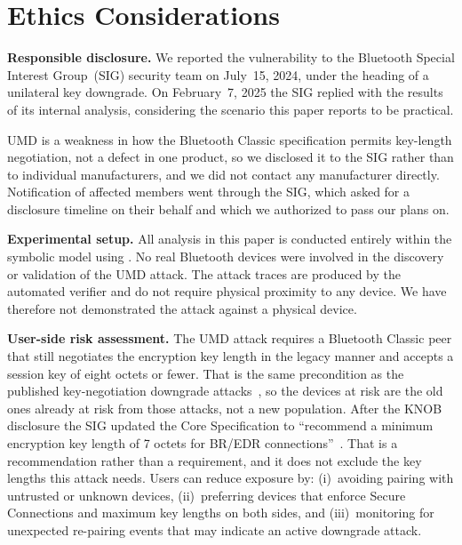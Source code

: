 \section*{Ethics Considerations}

\noindent
\textbf{Responsible disclosure.}
We reported the vulnerability to the Bluetooth Special Interest Group~(SIG) security team on July~15, 2024, 
under the heading of a unilateral key downgrade.
On February~7, 2025 the SIG replied with the results of its internal analysis, considering the
scenario this paper reports to be practical.

UMD is a weakness in how the Bluetooth Classic specification permits key-length negotiation, not a
defect in one product, so we disclosed it to the SIG rather than to individual manufacturers, and
we did not contact any manufacturer directly.
Notification of affected members went through the SIG, which asked for a disclosure timeline on
their behalf and which we authorized to pass our plans on.

\noindent
\textbf{Experimental setup.}
All analysis in this paper is conducted entirely within the symbolic model using \Tamarin{}.
No real Bluetooth devices were involved in the discovery or validation of the UMD attack.
The attack traces are produced by the automated verifier and do not require physical proximity to
any device.
We have therefore not demonstrated the attack against a physical device.

\noindent
\textbf{User-side risk assessment.}
The UMD attack requires a Bluetooth Classic peer that still negotiates the encryption key length
in the legacy manner and accepts a session key of eight octets or fewer. That is the same
precondition as the published key-negotiation downgrade attacks~\cite{antonioli2019knob}, so the
devices at risk are the old ones already at risk from those attacks, not a new population.
After the KNOB disclosure the SIG updated the Core Specification to ``recommend a minimum
encryption key length of 7 octets for BR/EDR connections''~\cite{sig2019knob}. That is a
recommendation rather than a requirement, and it does not exclude the key lengths this attack
needs.
Users can reduce exposure by: (i)~avoiding pairing with untrusted or unknown devices,
(ii)~preferring devices that enforce Secure Connections and maximum key lengths on both sides, and
(iii)~monitoring for unexpected re-pairing events that may indicate an active downgrade attack.

